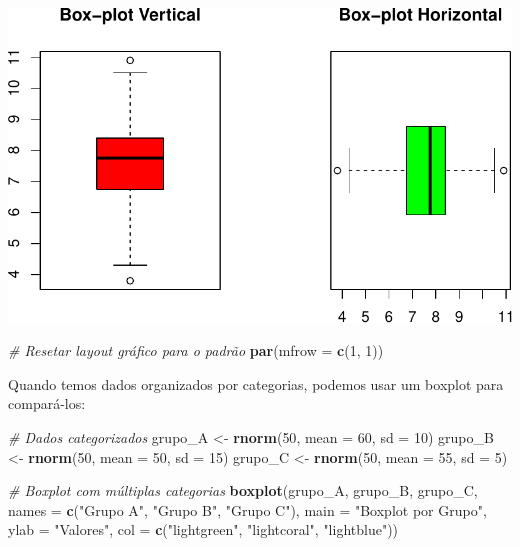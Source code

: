 \documentclass[
]{book}
\newenvironment{Shaded}{\begin{snugshade}}{\end{snugshade}}
\newcommand{\AttributeTok}[1]{\textcolor[rgb]{0.13,0.29,0.53}{#1}}
\newcommand{\CommentTok}[1]{\textcolor[rgb]{0.56,0.35,0.01}{\textit{#1}}}
\newcommand{\DecValTok}[1]{\textcolor[rgb]{0.00,0.00,0.81}{#1}}
\newcommand{\FunctionTok}[1]{\textcolor[rgb]{0.13,0.29,0.53}{\textbf{#1}}}
\newcommand{\NormalTok}[1]{#1}
\newcommand{\OtherTok}[1]{\textcolor[rgb]{0.56,0.35,0.01}{#1}}
\newcommand{\StringTok}[1]{\textcolor[rgb]{0.31,0.60,0.02}{#1}}
\begin{document}
\includegraphics{introR_files/figure-latex/unnamed-chunk-176-1.pdf}

\begin{Shaded}
\begin{Highlighting}[]
\CommentTok{\# Resetar layout gráfico para o padrão}
\FunctionTok{par}\NormalTok{(}\AttributeTok{mfrow =} \FunctionTok{c}\NormalTok{(}\DecValTok{1}\NormalTok{, }\DecValTok{1}\NormalTok{))}
\end{Highlighting}
\end{Shaded}

Quando temos dados organizados por categorias, podemos usar um boxplot para compará-los:

\begin{Shaded}
\begin{Highlighting}[]
\CommentTok{\# Dados categorizados}
\NormalTok{grupo\_A }\OtherTok{\textless{}{-}} \FunctionTok{rnorm}\NormalTok{(}\DecValTok{50}\NormalTok{, }\AttributeTok{mean =} \DecValTok{60}\NormalTok{, }\AttributeTok{sd =} \DecValTok{10}\NormalTok{)}
\NormalTok{grupo\_B }\OtherTok{\textless{}{-}} \FunctionTok{rnorm}\NormalTok{(}\DecValTok{50}\NormalTok{, }\AttributeTok{mean =} \DecValTok{50}\NormalTok{, }\AttributeTok{sd =} \DecValTok{15}\NormalTok{)}
\NormalTok{grupo\_C }\OtherTok{\textless{}{-}} \FunctionTok{rnorm}\NormalTok{(}\DecValTok{50}\NormalTok{, }\AttributeTok{mean =} \DecValTok{55}\NormalTok{, }\AttributeTok{sd =} \DecValTok{5}\NormalTok{)}

\CommentTok{\# Boxplot com múltiplas categorias}
\FunctionTok{boxplot}\NormalTok{(grupo\_A, grupo\_B, grupo\_C, }
        \AttributeTok{names =} \FunctionTok{c}\NormalTok{(}\StringTok{"Grupo A"}\NormalTok{, }\StringTok{"Grupo B"}\NormalTok{, }\StringTok{"Grupo C"}\NormalTok{),}
        \AttributeTok{main =} \StringTok{"Boxplot por Grupo"}\NormalTok{,}
        \AttributeTok{ylab =} \StringTok{"Valores"}\NormalTok{,}
        \AttributeTok{col =} \FunctionTok{c}\NormalTok{(}\StringTok{"lightgreen"}\NormalTok{, }\StringTok{"lightcoral"}\NormalTok{, }\StringTok{"lightblue"}\NormalTok{))}
\end{Highlighting}
\end{Shaded}
\end{document}
